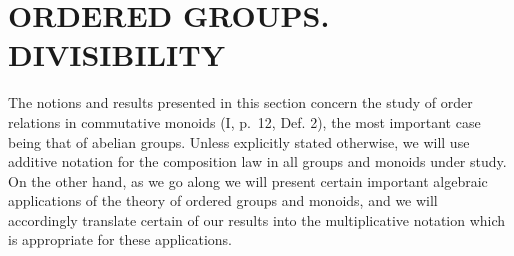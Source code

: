 \section{ORDERED GROUPS. DIVISIBILITY}

The notions and results presented in this section concern the study of order relations in commutative monoids (I, p.~12, Def. 2), the most important case being that of abelian groups. Unless explicitly stated otherwise, we will use additive notation for the composition law in all groups and monoids under study. On the other hand, as we go along we will present certain important algebraic applications of the theory of ordered groups and monoids, and we will accordingly translate certain of our results into the multiplicative notation which is appropriate for these applications.

